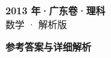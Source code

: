 \documentclass[zihao=-4, a4paper]{ctexart}
\begin{document}
\begin{center}
  {\Large\bfseries 2013 年·广东卷·理科}\\[4pt]
  {\large 数学 · 解析版}
\end{center}
\medskip
{}

\clearpage
{}
\begin{center}{\Large\bfseries 参考答案与详细解析}\end{center}
\medskip

\end{document}
